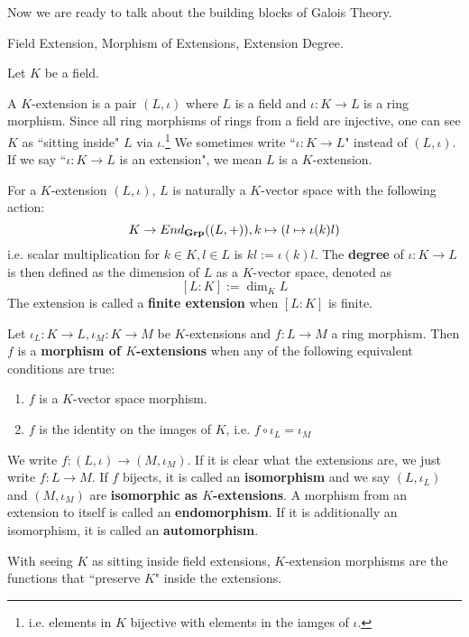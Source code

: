 \documentclass[../book.tex]{subfiles}
\begin{document}
Now we are ready to talk about the building blocks of Galois Theory.

\begin{dfn} Field Extension, Morphism of Extensions, Extension Degree.

    Let $K$ be a field. 

    A $K$-extension is a pair $(L,\iota)$ where $L$ is a field 
    and $\iota : K \to L$ is a ring morphism. 
    Since all ring morphisms of rings from a field are injective,
    one can see $K$ as ``sitting inside" $L$ via $\iota$.\footnote{
        i.e. elements in $K$ bijective with 
        elements in the iamges of $\iota$. 
    }
    We sometimes write ``$\iota : K \to L$" instead of $(L,\iota)$.
    If we say ``$\iota : K \to L$ is an extension", we mean
    $L$ is a $K$-extension.
    
    For a $K$-extension $(L,\iota)$, 
    $L$ is naturally a $K$-vector space with the following action: 
    \[
        K \to End_{\mathbf{Grp}}((L,+)), k \mapsto (l \mapsto \iota(k) l)
    \]
    i.e. scalar multiplication for $k \in K, l \in L$ is $kl := \iota(k)l$.
    The \textbf{degree} of $\iota : K \to L$ is then defined as
    the dimension of $L$ as a $K$-vector space, denoted as \[
        [L : K] := \dim_K L
    \]
    The extension is called a \textbf{finite extension} when $[L:K]$ is finite. 
    
    Let $\iota_L : K \to L, \iota_M : K \to M$ be $K$-extensions and
    $f : L \to M$ a ring morphism.
    Then $f$ is a \textbf{morphism of $K$-extensions} when 
    any of the following equivalent conditions are true: 
    \begin{enumerate}
        \item $f$ is a $K$-vector space morphism.
        \item $f$ is the identity on the images of $K$, i.e.
        $f\circ\iota_L = \iota_M$
    \end{enumerate}
    We write $f : (L,\iota) \to (M,\iota_M)$. 
    If it is clear what the extensions are, we just write $f : L \to M$. 
    If $f$ bijects, it is called an \textbf{isomorphism} and
    we say $(L,\iota_L)$ and $(M,\iota_M)$ are \textbf{isomorphic as $K$-extensions}.
    A morphism from an extension to itself is called an \textbf{endomorphism}.
    If it is additionally an isomorphism, it is called an \textbf{automorphism}. 
    
    With seeing $K$ as sitting inside field extensions, 
    $K$-extension morphisms are the functions that ``preserve $K$" 
    inside the extensions. 
\end{dfn}
\end{document}
